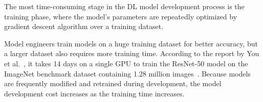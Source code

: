 
\begin{inred}
The most time-consuming stage in the DL model development process is the
training phase, where the model's parameters are repeatedly optimized 
by gradient descent algorithm over a training dataset.
\end{inred}
Model engineers train models on a huge training dataset for better accuracy,
but a larger dataset also requires more training time.
According to the report by You et al.~\cite{imagenettraining2017}, it takes 14
days on a single GPU to train the ResNet-50 model on the ImageNet benchmark
dataset containing 1.28 million images~\cite{imagenet2014}.
Because models are frequently modified and retrained during development, the
model development cost increases as the training time increases.

